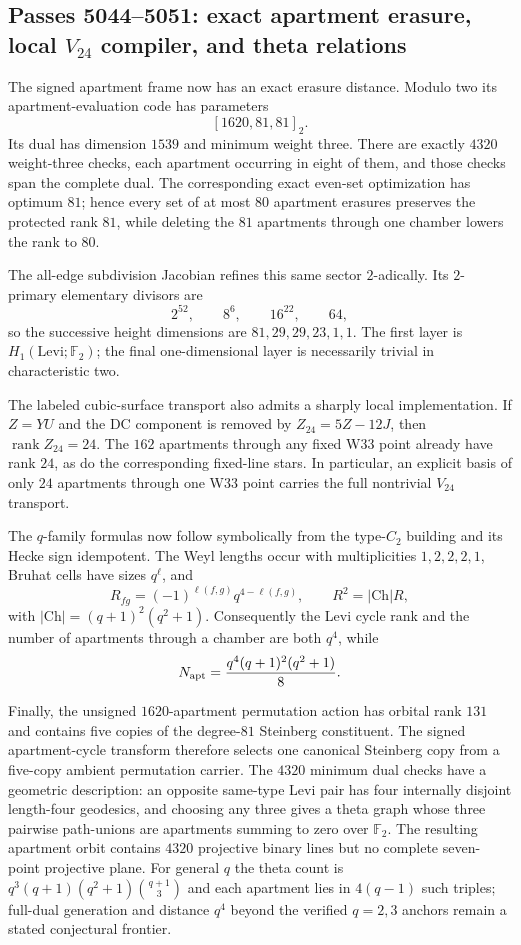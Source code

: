 \subsection*{Passes 5044--5051: exact apartment erasure, local $V_{24}$ compiler, and theta relations}
The signed apartment frame now has an exact erasure distance.  Modulo two its apartment-evaluation code has parameters
\[
[1620,81,81]_2.
\]
Its dual has dimension $1539$ and minimum weight three.  There are exactly $4320$ weight-three checks, each apartment occurring in eight of them, and those checks span the complete dual.  The corresponding exact even-set optimization has optimum $81$; hence every set of at most $80$ apartment erasures preserves the protected rank $81$, while deleting the $81$ apartments through one chamber lowers the rank to $80$.

The all-edge subdivision Jacobian refines this same sector $2$-adically.  Its $2$-primary elementary divisors are
\[
2^{52},\qquad 8^6,\qquad 16^{22},\qquad 64,
\]
so the successive height dimensions are $81,29,29,23,1,1$.  The first layer is $H_1(\mathrm{Levi};\mathbb F_2)$; the final one-dimensional layer is necessarily trivial in characteristic two.

The labeled cubic-surface transport also admits a sharply local implementation.  If $Z=YU$ and the DC component is removed by $Z_{24}=5Z-12J$, then $\operatorname{rank}Z_{24}=24$.  The $162$ apartments through any fixed W33 point already have rank $24$, as do the corresponding fixed-line stars.  In particular, an explicit basis of only $24$ apartments through one W33 point carries the full nontrivial $V_{24}$ transport.

The $q$-family formulas now follow symbolically from the type-$C_2$ building and its Hecke sign idempotent.  The Weyl lengths occur with multiplicities $1,2,2,2,1$, Bruhat cells have sizes $q^{\ell}$, and
\[
R_{fg}=(-1)^{\ell(f,g)}q^{4-\ell(f,g)},\qquad R^2=|\mathrm{Ch}|R,
\]
with $|\mathrm{Ch}|=(q+1)^2(q^2+1)$.  Consequently the Levi cycle rank and the number of apartments through a chamber are both $q^4$, while
\[
N_{\rm apt}=\frac{q^4(q+1)^2(q^2+1)}8.
\]

Finally, the unsigned $1620$-apartment permutation action has orbital rank $131$ and contains five copies of the degree-$81$ Steinberg constituent.  The signed apartment-cycle transform therefore selects one canonical Steinberg copy from a five-copy ambient permutation carrier.  The $4320$ minimum dual checks have a geometric description: an opposite same-type Levi pair has four internally disjoint length-four geodesics, and choosing any three gives a theta graph whose three pairwise path-unions are apartments summing to zero over $\mathbb F_2$.  The resulting apartment orbit contains $4320$ projective binary lines but no complete seven-point projective plane.  For general $q$ the theta count is $q^3(q+1)(q^2+1)\binom{q+1}{3}$ and each apartment lies in $4(q-1)$ such triples; full-dual generation and distance $q^4$ beyond the verified $q=2,3$ anchors remain a stated conjectural frontier.
